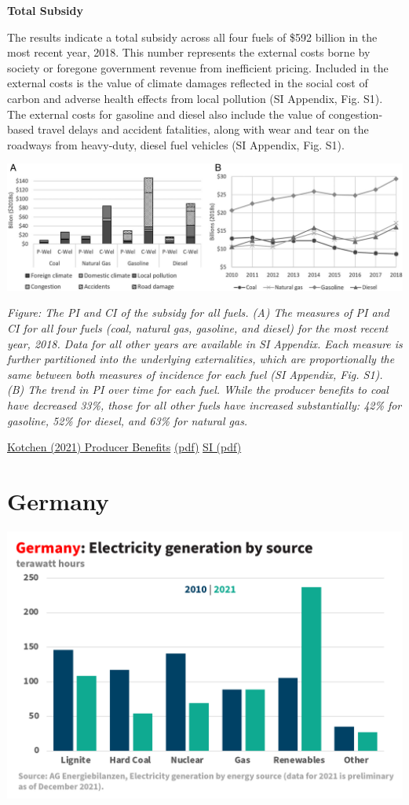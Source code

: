 \documentclass[
]{book}
\begin{document}
\textbf{Total Subsidy}

The results indicate a total subsidy across all four fuels of \$592 billion in the most recent year, 2018. This number represents the external costs borne by society or foregone government revenue from inefficient pricing. Included in the external costs is the value of climate damages reflected in the social cost of carbon and adverse health effects from local pollution (SI Appendix, Fig. S1). The external costs for gasoline and diesel also include the value of congestion-based travel delays and accident fatalities, along with wear and tear on the roadways from heavy-duty, diesel fuel vehicles (SI Appendix, Fig. S1).

\includegraphics{fig/fossil_subsidy_2.jpg}

\emph{Figure: The PI and CI of the subsidy for all fuels. (A) The measures of PI and CI for all four fuels (coal, natural gas, gasoline, and diesel) for the most recent year, 2018. Data for all other years are available in SI Appendix. Each measure is further partitioned into the underlying externalities, which are proportionally the same between both measures of incidence for each fuel (SI Appendix, Fig. S1). (B) The trend in PI over time for each fuel. While the producer benefits to coal have decreased 33\%, those for all other fuels have increased substantially: 42\% for gasoline, 52\% for diesel, and 63\% for natural gas.}

\href{https://www.pnas.org/content/118/14/e2011969118}{Kotchen (2021) Producer Benefits}
\href{pdf/Kotchen_2021_Fossil_Subsidies.pdf}{(pdf)}
\href{pdf/Kotchen_2021_Fossil_Subsidies_SI.pdf}{SI (pdf)}

\hypertarget{germany}{%
\chapter{Germany}\label{germany}}

\includegraphics{fig/Germany_2010_2021_Electricty_by_Source.png}
\end{document}
